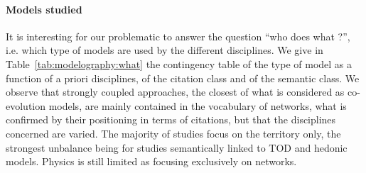 \documentclass[10pt]{article}
\begin{document}
\paragraph{Models studied}

It is interesting for our problematic to answer the question ``who does what ?'', i.e. which type of models are used by the different disciplines. We give in Table~\ref{tab:modelography:what} the contingency table of the type of model as a function of a priori disciplines, of the citation class and of the semantic class. We observe that strongly coupled approaches, the closest of what is considered as co-evolution models, are mainly contained in the vocabulary of networks, what is confirmed by their positioning in terms of citations, but that the disciplines concerned are varied. The majority of studies focus on the territory only, the strongest unbalance being for studies semantically linked to TOD and hedonic models. Physics is still limited as focusing exclusively on networks.
\end{document}
